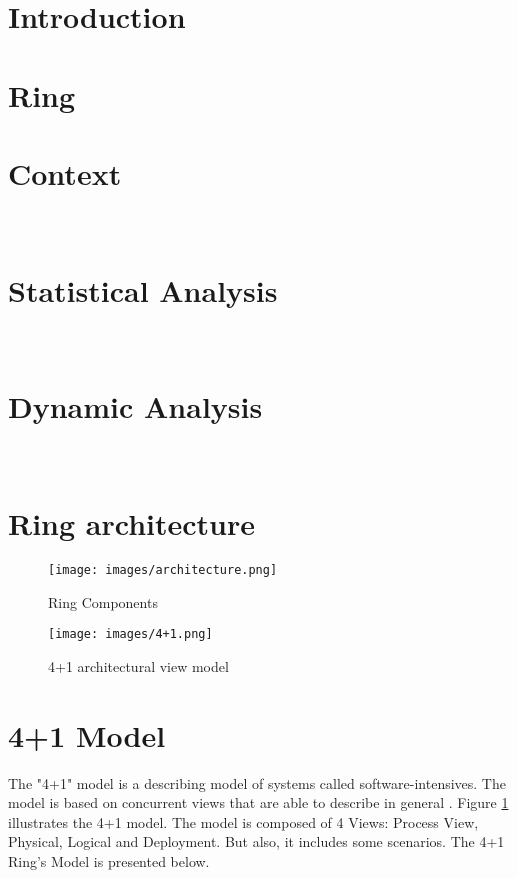 {
\graphicspath{{TP1/}}
\newpage
\section{Introduction}
\label{sec:TP1/introduction}



\section{Ring}
\label{sec:TP1/ring}


\section{Context}\
\label{sec:TP1/context}


\section{Statistical Analysis}\
\label{sec:TP1/static}


\section{Dynamic Analysis}\
\label{sec:TP1/dynamic}


\section{Ring architecture}
\begin{figure}[ht!]
\centering
\texttt{[image: images/architecture.png]}
\caption{Ring Components}
\end{figure}
\begin{figure}[ht!]

\centering
\texttt{[image: images/4+1.png]}
\caption{4+1 architectural view model \cite{modeling}}
\label{fig:4+1 arch}
\end{figure}

\section{4+1 Model}
The "4+1" model is a describing model of systems called software-intensives. The model is based on concurrent views that are able to describe in general \cite{blueprints}. Figure \ref{fig:4+1 arch} illustrates the 4+1 model.
The model is composed of 4 Views: Process View, Physical, Logical and Deployment. But also, it includes some scenarios. The 4+1 Ring's Model is presented below.

}
